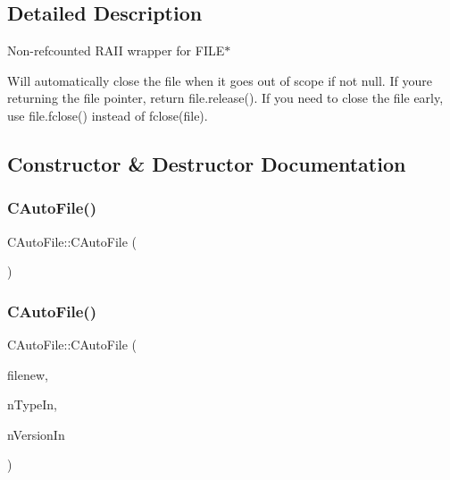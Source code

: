 \subsection{Detailed Description}
Non-\/refcounted R\+A\+II wrapper for F\+I\+L\+E$\ast$

Will automatically close the file when it goes out of scope if not null. If you\textquotesingle{}re returning the file pointer, return file.\+release(). If you need to close the file early, use file.\+fclose() instead of fclose(file). 

\subsection{Constructor \& Destructor Documentation}
\mbox{\label{class_c_auto_file_a2d7c38154632735962c24d472c01608c}} 
\subsubsection{\texorpdfstring{C\+Auto\+File()}{CAutoFile()}\hspace{0.1cm}{\footnotesize\ttfamily [1/2]}}
{\footnotesize\ttfamily C\+Auto\+File\+::\+C\+Auto\+File (\begin{DoxyParamCaption}\item[{const \mbox{\hyperlink{class_c_auto_file}{C\+Auto\+File}} \&}]{ }\end{DoxyParamCaption})\hspace{0.3cm}{\ttfamily [private]}}

\mbox{\label{class_c_auto_file_a52613083aaeab4c9238c649ae471783f}} 
\subsubsection{\texorpdfstring{C\+Auto\+File()}{CAutoFile()}\hspace{0.1cm}{\footnotesize\ttfamily [2/2]}}
{\footnotesize\ttfamily C\+Auto\+File\+::\+C\+Auto\+File (\begin{DoxyParamCaption}\item[{F\+I\+LE $\ast$}]{filenew,  }\item[{int}]{n\+Type\+In,  }\item[{int}]{n\+Version\+In }\end{DoxyParamCaption})\hspace{0.3cm}{\ttfamily [inline]}}

